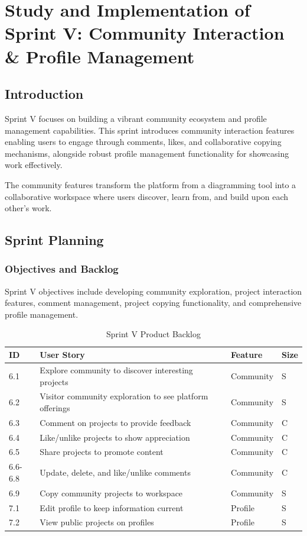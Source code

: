 \chapter[Sprint V]{Study and Implementation of Sprint V: Community Interaction \& Profile Management}

\section{Introduction}

Sprint V focuses on building a vibrant community ecosystem and profile management capabilities. This sprint introduces community interaction features enabling users to engage through comments, likes, and collaborative copying mechanisms, alongside robust profile management functionality for showcasing work effectively.

The community features transform the platform from a diagramming tool into a collaborative workspace where users discover, learn from, and build upon each other's work.

\section{Sprint Planning}

\subsection{Objectives and Backlog}

Sprint V objectives include developing community exploration, project interaction features, comment management, project copying functionality, and comprehensive profile management.

\begin{table}[H]
\centering
\caption{Sprint V Product Backlog}
\begin{tabular}{|p{0.8cm}|p{7cm}|p{2cm}|p{0.8cm}|}
\hline
\textbf{ID} & \textbf{User Story} & \textbf{Feature} & \textbf{Size} \\
\hline
6.1 & Explore community to discover interesting projects & Community & S \\
\hline
6.2 & Visitor community exploration to see platform offerings & Community & S \\
\hline
6.3 & Comment on projects to provide feedback & Community & C \\
\hline
6.4 & Like/unlike projects to show appreciation & Community & C \\
\hline
6.5 & Share projects to promote content & Community & C \\
\hline
6.6-6.8 & Update, delete, and like/unlike comments & Community & C \\
\hline
6.9 & Copy community projects to workspace & Community & S \\
\hline
7.1 & Edit profile to keep information current & Profile & S \\
\hline
7.2 & View public projects on profiles & Profile & S \\
\hline
\end{tabular}
\end{table}

